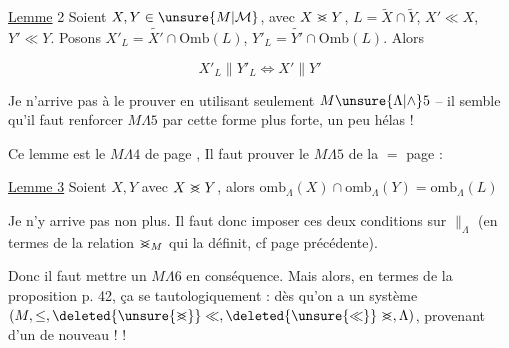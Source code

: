 
\uline{Lemme} 2 Soient $X,Y\in\unsure{M|\mathcal M}$, avec $X\mathrel{>\mkern-13mu<}Y$, $L=\widetilde X\cap\widetilde Y$, $X'\ll X$, $Y'\ll Y$. Posons $X'_L=\widetilde{X'}\cap\mathrm{Omb}(L)$, $Y'_L=\widetilde{Y'}\cap\mathrm{Omb}(L)$. Alors

\[
X'_L\parallel Y'_L\Longleftrightarrow X'\parallel Y'
\]

 Je n'arrive pas à le prouver en utilisant seulement $M\unsure{\Lambda|\wedge}5$ -- il semble qu'il faut renforcer $M\Lambda5$ par cette forme plus forte, un peu  hélas !

Ce lemme est le $M\Lambda4$ de page , Il faut prouver le $M\Lambda5$ de la $=$ page :

\uline{Lemme 3} Soient $X,Y$ avec $X\mathrel{>\mkern-13mu<}Y$,    alors $\mathrm{omb}_{\Lambda}(X)\cap\mathrm{omb}_{\Lambda}(Y)=\mathrm{omb}_{\Lambda}(L)$

Je n'y arrive pas non plus. Il faut donc imposer ces deux conditions sur $\parallel_{\Lambda}$ (en termes de la relation $\mathrel{>\mkern-13mu<}_{M}$ qui la définit, cf page précédente).

Donc il faut mettre un $M\Lambda6$ en conséquence. Mais alors, en termes de la proposition p. 42, ça se  tautologiquement : dès qu'on a un système $(M,\leq,\deleted{\unsure{\mathrel{>\mkern-13mu<}}}\ll,\deleted{\unsure{\ll}}\mathrel{>\mkern-13mu<},\Lambda)$,  provenant d'un     de nouveau !  !

